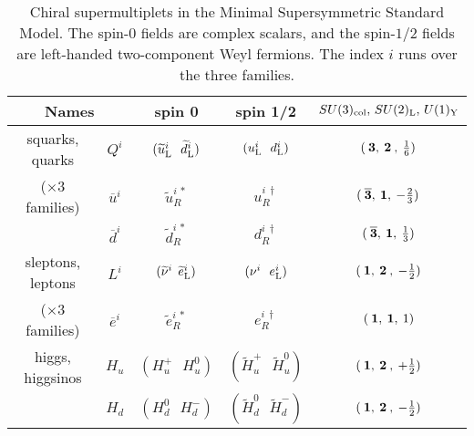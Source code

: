 \documentclass[12pt,a4paper]{book}
\begin{document}
\renewcommand{\arraystretch}{1.6}
\begin{table}[tb]
\begin{center}
\begin{tabular}{|c|c|c|c|c|}
\hline
\multicolumn{2}{|c|}{Names} 
& spin 0 & spin 1/2 & $SU(3)_{\rm col} ,\, SU(2)_{\rm L} ,\, U(1)_{\rm Y}$
\\  \hline\hline
squarks, quarks & $Q^i$ & $({\widetilde u}^i_{\rm L}\>\>\>{\widetilde d}^i_{\rm L} )$&
 $(u^i_{\rm L}\>\>\>d^i_{\rm L})$ & $(\>{\bf 3},\>{\bf 2}\>,\>{\frac{1}{6}})$
\\
($\times 3$ families) & $\overline{u}^i$
&${\widetilde u}^{i \, *}_R$ & $u^{i \, \dagger}_R$ & 
$(\>{\bf \overline 3},\> {\bf 1},\> -{\frac{2}{3}})$
\\ & $\overline{d}^i$ &${\widetilde d}^{i \, *}_R$ & $d^{i \, \dagger}_R$ & 
$(\>{\bf \overline 3},\> {\bf 1},\> {\frac{1}{3}})$
\\  \hline
sleptons, leptons & $L^i$ &$({\widetilde \nu}^i\>\>{\widetilde e}^i_{\rm L} )$&
 $(\nu^i\>\>\>e^i_{\rm L})$ & $(\>{\bf 1},\>{\bf 2}\>,\>-{1\over 2})$
\\
($\times 3$ families) & $\overline{e}^i$
&${\widetilde e}^{i \, *}_R$ & $e^{i \, \dagger}_R$ & $(\>{\bf 1},\> {\bf 1},\>1)$
\\  \hline
higgs, higgsinos &$H_u$ &$(H_u^+\>\>\>H_u^0 )$&
$(\widetilde H_u^+ \>\>\> \widetilde H_u^0)$& 
$(\>{\bf 1},\>{\bf 2}\>,\>+{\frac{1}{2}})$
\\ &$H_d$ & $(H_d^0 \>\>\> H_d^-)$ & $(\widetilde H_d^0 \>\>\> \widetilde H_d^-)$& 
$(\>{\bf 1},\>{\bf 2}\>,\>-{\frac{1}{2}})$
\\  \hline
\end{tabular}
\caption{Chiral supermultiplets in the Minimal Supersymmetric Standard Model. The spin-$0$ fields are complex scalars, and the spin-$1/2$ fields are left-handed two-component Weyl fermions. The index $i$ runs over the three families. \label{tab:MSSMSpectrum}}
\vspace{-0.6cm}
\end{center}
\end{table}
\end{document}
